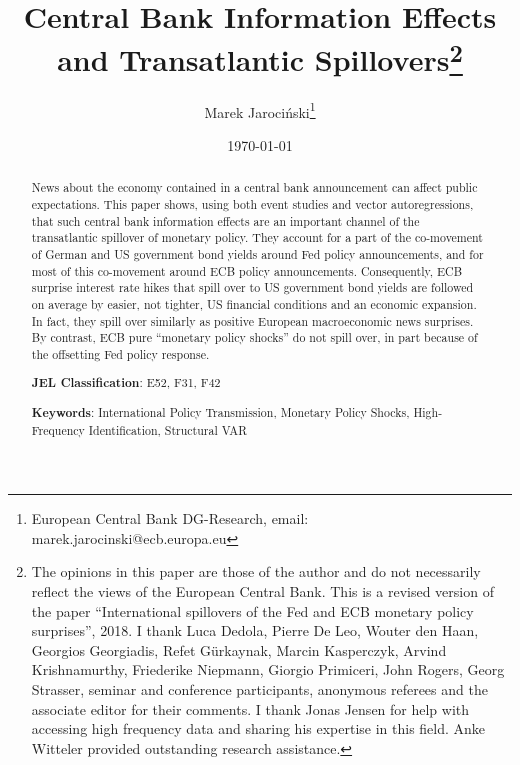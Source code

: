 \documentclass[a4paper,12pt]{article}
\begin{document}

\author{Marek Jaroci\'nski\thanks{%
European Central Bank DG-Research, email: marek.jarocinski@ecb.europa.eu}}
\title{Central Bank Information Effects and Transatlantic Spillovers\thanks{%
The opinions in this paper are
those of the author and do not necessarily reflect the views of the
European Central Bank.
This is a revised version of the paper ``International spillovers of the Fed and ECB monetary policy surprises'', 2018. I thank Luca Dedola, Pierre De Leo, Wouter den Haan, Georgios Georgiadis, Refet G\"urkaynak, Marcin Kasperczyk, Arvind Krishnamurthy, Friederike Niepmann, Giorgio Primiceri, John Rogers, Georg Strasser, seminar and conference participants, anonymous referees and the associate editor for their comments. I thank Jonas Jensen for help with accessing high frequency data and sharing his expertise in this field. Anke Witteler provided outstanding research assistance.}}
\date{\today}
\maketitle

\begin{abstract}
News about the economy contained in a central bank announcement can affect public expectations. This paper shows, using both event studies and vector autoregressions, that such central bank information effects are an important channel of the transatlantic spillover of monetary policy. They account for a part of the co-movement of German and US government bond yields around Fed policy announcements,
and for most of this co-movement around ECB policy announcements.
Consequently, ECB surprise interest rate hikes that spill over to US government bond yields are followed on average by easier, not tighter, US financial conditions and an economic expansion.
In fact, they spill over similarly as positive European macroeconomic news surprises.
By contrast, ECB pure ``monetary policy shocks'' do not spill over,
in part because of the offsetting Fed policy response.


\bigskip

\noindent \textbf{JEL Classification}: E52, F31, F42

\noindent \textbf{Keywords}: International Policy Transmission, Monetary Policy Shocks, High-Frequency Identification, Structural VAR
\end{abstract}


\pagebreak

\setcounter{page}{1}
\end{document}
